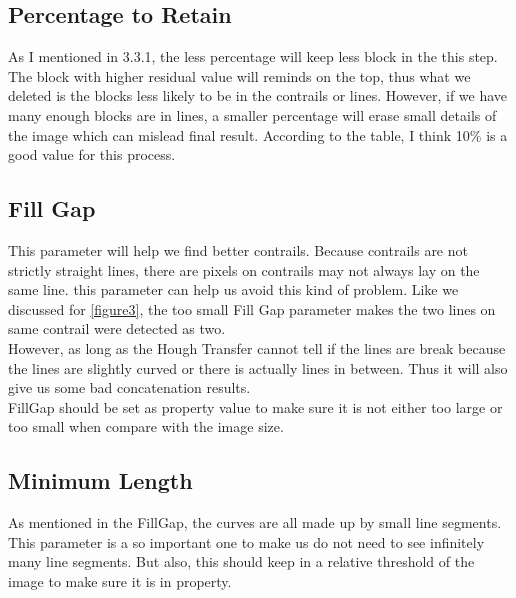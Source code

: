 \subsection{Percentage to Retain}
As I mentioned in 3.3.1, the less percentage will keep less block in the this step.
The block with higher residual value will reminds on the top, thus what we deleted is the blocks less likely to be in the contrails or lines. However, if we have many enough blocks are in lines, a smaller percentage will erase small details of the image which can mislead final result. According to the table, I think 10\% is a good value for this process.

\subsection{Fill Gap}
This parameter will help we find better contrails. Because contrails are not strictly straight lines, there are pixels on contrails may not always lay on the same line. this parameter can help us avoid this kind of problem. Like we discussed for \ref{figure3}, the too small Fill Gap parameter makes the two lines on same contrail were detected as two.\\
However, as long as the Hough Transfer cannot tell if the lines are break because the lines are slightly curved or there is actually lines in between. Thus it will also give us some bad concatenation results. \\
FillGap should be set as property value to make sure it is not either too large or too small when compare with the image size.


\subsection{Minimum Length}
As mentioned in the FillGap, the curves are all made up by small line segments. This parameter is a so important one to make us do not need to see infinitely many line segments. But also, this should keep in a relative threshold of the image to make sure it is in property.



